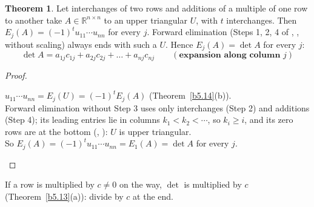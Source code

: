 \documentclass[12pt]{article}
\newcommand{\R}{\mathbb R}
\theoremstyle{definition}
\newtheorem{theorem}{Theorem}
\begin{document}
\begin{theorem}\label{b5.15}
Let interchanges of two rows and additions of a multiple of one row to another take \(A\in\R^{n\times n}\) to an upper
triangular \(U\), with \(t\) interchanges. Then \(E_j(A)=(-1)^tu_{11}\cdots u_{nn}\) for every \(j\). Forward elimination
(Steps 1, 2, 4 of , , without scaling) always ends with such a \(U\). Hence \(E_j(A)=\det A\) for every \(j\):
\[
\det A=a_{1j}c_{1j}+a_{2j}c_{2j}+\dots+a_{nj}c_{nj}\qquad(\textbf{expansion along column }j)
\]
\end{theorem}
\begin{proof}
\begin{board}
\(u_{11}\cdots u_{nn}=E_j(U)=(-1)^tE_j(A)\) (Theorem~\ref{b5.14}(b)).\\
Forward elimination without Step 3 uses only interchanges (Step 2) and additions (Step 4); its leading entries lie in
columns \(k_1<k_2<\cdots\), so \(k_i\geqslant i\), and its zero rows are at the bottom (, ):
\(U\) is upper triangular.\\
So \(E_j(A)=(-1)^tu_{11}\cdots u_{nn}=E_1(A)=\det A\) for every \(j\).
\end{board}
\nopagebreak
\end{proof}
If a row is multiplied by \(c\ne0\) on the way, \(\det\) is multiplied by \(c\) (Theorem~\ref{b5.13}(a)): divide by \(c\) at
the end.
\end{document}
